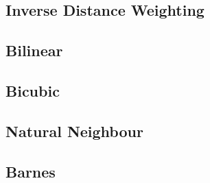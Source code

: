         \subsection{Inverse Distance Weighting}\label{prediction_evaluation_results_inverse_distance_weighting}

        \subsection{Bilinear}\label{prediction_evaluation_results_bilinear}

        \subsection{Bicubic}\label{prediction_evaluation_results_bicubic}

        \subsection{Natural Neighbour}\label{prediction_evaluation_results_natural_neighbour}

        \subsection{Barnes}\label{prediction_evaluation_results_barnes}

           
